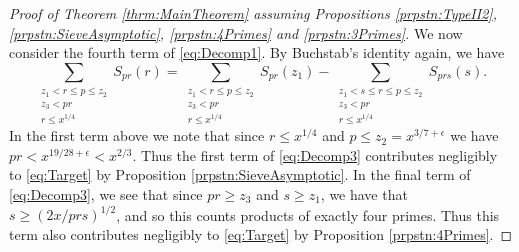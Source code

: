 \documentclass[10pt]{amsart}
\theoremstyle{plain}
\numberwithin{equation}{section}
\begin{document}
\begin{proof}[Proof of Theorem \ref{thrm:MainTheorem} assuming Propositions \ref{prpstn:TypeII2}, \ref{prpstn:SieveAsymptotic}, \ref{prpstn:4Primes} and \ref{prpstn:3Primes}]
We now consider the fourth term of \eqref{eq:Decomp1}. By Buchstab's identity again, we have
\begin{equation}
\sum_{\substack{z_1< r\le p\le z_2\\ z_3<p r\\  r\le x^{1/4}}}S_{p r}(r)=\sum_{\substack{z_1< r\le p\le z_2\\ z_3<p r\\  r\le x^{1/4}}}S_{p r}(z_1)-\sum_{\substack{z_1< s\le r\le p\le z_2\\ z_3<p r\\  r\le x^{1/4}}}S_{p r s}(s).
\label{eq:Decomp3}
\end{equation}
In the first term above we note that since $r\le x^{1/4}$ and $p\le z_2=x^{3/7+\epsilon}$ we have $p r< x^{19/28+\epsilon}<x^{2/3}$. Thus the first term of \eqref{eq:Decomp3} contributes negligibly to \eqref{eq:Target} by Proposition \ref{prpstn:SieveAsymptotic}. In the final term of \eqref{eq:Decomp3}, we see that since $p r\ge z_3$ and $s\ge z_1$, we have that $s\ge (2x/p r s)^{1/2}$, and so this counts products of exactly four primes. Thus this term also contributes negligibly to \eqref{eq:Target} by Proposition \ref{prpstn:4Primes}.


\end{proof}
\end{document}
